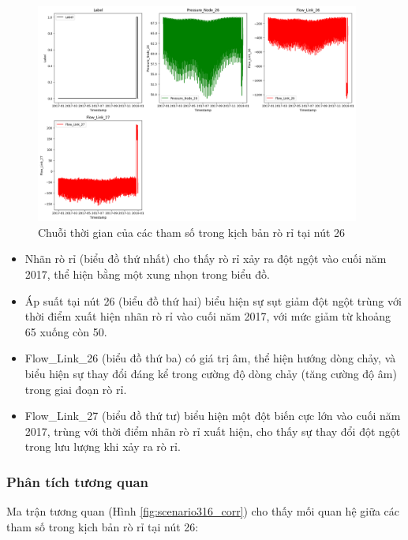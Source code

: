 \begin{figure}[H]
    \centering
    \includegraphics[width=0.95\textwidth]{image/section5_1/scenario316_timeseries.png}
    \caption{Chuỗi thời gian của các tham số trong kịch bản rò rỉ tại nút 26}
    \label{fig:scenario316_timeseries}
\end{figure}

\begin{itemize}
    \item Nhãn rò rỉ (biểu đồ thứ nhất) cho thấy rò rỉ xảy ra đột ngột vào cuối năm 2017, thể hiện bằng một xung nhọn trong biểu đồ.
    \item Áp suất tại nút 26 (biểu đồ thứ hai) biểu hiện sự sụt giảm đột ngột trùng với thời điểm xuất hiện nhãn rò rỉ vào cuối năm 2017, với mức giảm từ khoảng 65 xuống còn 50.
    \item Flow\_Link\_26 (biểu đồ thứ ba) có giá trị âm, thể hiện hướng dòng chảy, và biểu hiện sự thay đổi đáng kể trong cường độ dòng chảy (tăng cường độ âm) trong giai đoạn rò rỉ.
    \item Flow\_Link\_27 (biểu đồ thứ tư) biểu hiện một đột biến cực lớn vào cuối năm 2017, trùng với thời điểm nhãn rò rỉ xuất hiện, cho thấy sự thay đổi đột ngột trong lưu lượng khi xảy ra rò rỉ.
\end{itemize}

\subsubsection{Phân tích tương quan}

Ma trận tương quan (Hình \ref{fig:scenario316_corr}) cho thấy mối quan hệ giữa các tham số trong kịch bản rò rỉ tại nút 26:

